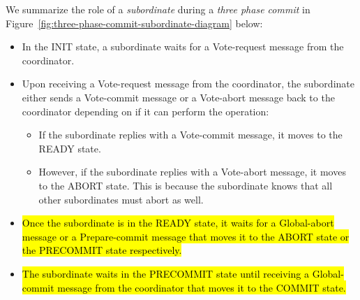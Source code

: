 \documentclass[twoside]{article}
\begin{document}
We summarize the role of a \emph{subordinate} during a \emph{three phase commit} in Figure~\ref{fig:three-phase-commit-subordinate-diagram} below:
\begin{itemize}
    \item In the {\ttfamily INIT} state, a subordinate waits for a {\ttfamily Vote-request} message from the coordinator.
    \item Upon receiving a {\ttfamily Vote-request} message from the coordinator, the subordinate either sends a {\ttfamily Vote-commit} message or a {\ttfamily Vote-abort} message back to the coordinator depending on if it can perform the operation:
        \begin{itemize}
            \item If the subordinate replies with a {\ttfamily Vote-commit} message, it moves to the {\ttfamily READY} state.
            \item However, if the subordinate replies with a {\ttfamily Vote-abort} message, it moves to the {\ttfamily ABORT} state. This is because the subordinate knows that all other subordinates must abort as well.
        \end{itemize}
    \item \hl{Once the subordinate is in the {\ttfamily READY} state, it waits for a {\ttfamily Global-abort} message or a {\ttfamily Prepare-commit} message that moves it to the {\ttfamily ABORT} state or the {\ttfamily PRECOMMIT} state respectively.}
    \item \hl{The subordinate waits in the {\ttfamily PRECOMMIT} state until receiving a {\ttfamily Global-commit} message from the coordinator that moves it to the {\ttfamily COMMIT} state.}
\end{itemize}
\end{document}

